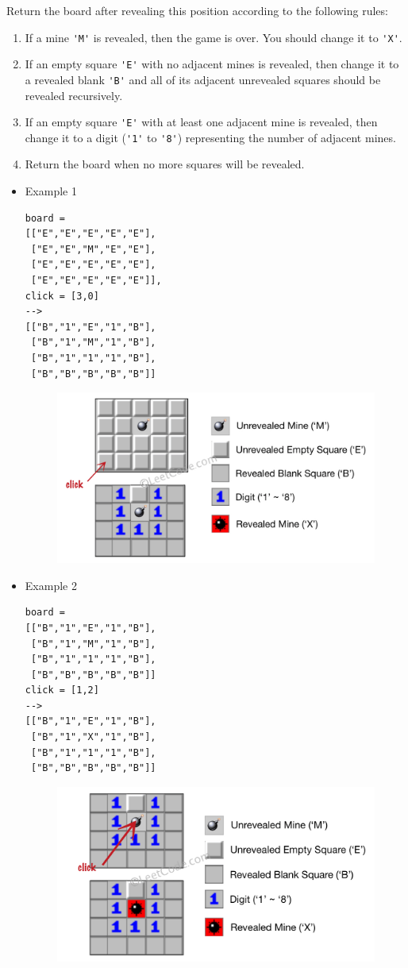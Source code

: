Return the board after revealing this position according to the following rules:
\begin{enumerate}
\item If a mine {\colorbox{CodeBackground}{\lstinline|'M'|}} is revealed, then the game is over. You should change it to {\colorbox{CodeBackground}{\lstinline|'X'|}}.
\item If an empty square {\colorbox{CodeBackground}{\lstinline|'E'|}} with no adjacent mines is revealed, then change it to a revealed blank {\colorbox{CodeBackground}{\lstinline|'B'|}} and all of its adjacent unrevealed squares should be revealed recursively.
\item If an empty square {\colorbox{CodeBackground}{\lstinline|'E'|}} with at least one adjacent mine is revealed, then change it to a digit ({\colorbox{CodeBackground}{\lstinline|'1'|}} to {\colorbox{CodeBackground}{\lstinline|'8'|}}) representing the number of adjacent mines.
\item Return the board when no more squares will be revealed.
\end{enumerate}

\begin{itemize}
\item Example 1
\begin{lstlisting}
board = 
[["E","E","E","E","E"],
 ["E","E","M","E","E"],
 ["E","E","E","E","E"],
 ["E","E","E","E","E"]], 
click = [3,0]
-->
[["B","1","E","1","B"],
 ["B","1","M","1","B"],
 ["B","1","1","1","B"],
 ["B","B","B","B","B"]]
\end{lstlisting}
\begin{figure}[H]
\centering
\includegraphics[width=0.4\linewidth]{images/lc0529_eg1}
\label{fig:lc0529eg1}
\end{figure}
\item Example 2
\begin{lstlisting}
board = 
[["B","1","E","1","B"],
 ["B","1","M","1","B"],
 ["B","1","1","1","B"],
 ["B","B","B","B","B"]]
click = [1,2]
-->
[["B","1","E","1","B"],
 ["B","1","X","1","B"],
 ["B","1","1","1","B"],
 ["B","B","B","B","B"]]
\end{lstlisting}
\begin{figure}[H]
\centering
\includegraphics[width=0.4\linewidth]{images/lc0529_eg2}
\label{fig:lc0529eg2}
\end{figure}
\end{itemize}

